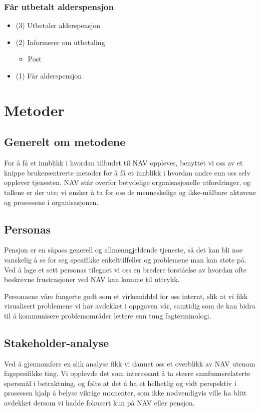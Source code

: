 \documentclass[informationsecurity]{gucmasterproject}
\begin{document}
\subsubsection{Får utbetalt alderspensjon}
\begin{itemize}
\item (3) Utbetaler alderspensjon
\item (2) Informerer om utbetaling
	\begin{itemize}
	\item Post
	\end{itemize}
\item (1) Får alderspensjon
\end{itemize}



\section{Metoder}
\subsection{Generelt om metodene}
For å få et innblikk i hvordan tilbudet til NAV oppleves, benyttet vi oss av et knippe brukersentrerte metoder for å få et innblikk i hvordan andre enn oss selv opplever tjenesten. NAV står overfor betydelige organisasjonelle utfordringer, og tallene er der ute; vi ønsker å ta for oss de menneskelige og ikke-målbare aktørene og prosessene i organisasjonen.

\subsection{Personas}
Pensjon er en såpass generell og allmenngjeldende tjeneste, så det kan bli noe vanskelig å se for seg spesifikke enkelttilfeller og problemene man kan støte på. Ved å lage et sett personas tilegnet vi oss en bredere forståelse av hvordan ofte beskrevne frustrasjoner ved NAV kan komme til uttrykk.

Personaene våre fungerte godt som et virkemiddel for oss internt, slik at vi fikk visualisert problemene vi har avdekket i oppgaven vår, samtidig som de kan bidra til å kommunisere problemområder lettere enn tung fagterminologi.

\subsection{Stakeholder-analyse}
Ved å gjennomføre en slik analyse fikk vi dannet oss et overblikk av NAV utenom fagspesifikke ting. Vi opplevde det som interessant å ta større samfunnsrelaterte spørsmål i betraktning, og følte at det å ha et helhetlig og vidt perspektiv i prosessen hjalp å belyse viktige momenter, som ikke nødvendigvis ville ha blitt avdekket dersom vi hadde fokusert kun på NAV eller pensjon.
\end{document}
